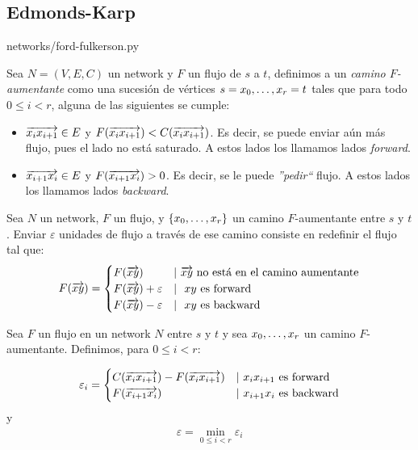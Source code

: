 \subsection{Edmonds-Karp}

\begin{lstinputlisting}[language=python]{networks/ford-fulkerson.py}
\end{lstinputlisting}

\begin{definition}
  Sea $N = (V,E,C)$ un network y $F$ un flujo de $s$ a $t$, definimos a un
  \emph{camino $F$-aumentante} como una sucesión de vértices
  $s = x_0, \mathellipsis, x_r = t$ tales que para todo $0 \le i < r$, alguna
  de las siguientes se cumple:
  \begin{itemize}
  \item $\overrightarrow{x_i x_{i+1}} \in E$ y
    $F(\overrightarrow{x_i x_{i+1}}) < C(\overrightarrow{x_i x_{i+1}})$. Es decir, se puede enviar aún
    más flujo, pues el lado no está saturado. A estos lados los llamamos lados
    \emph{forward}.
  \item $\overrightarrow{x_{i+1} x_i} \in E$ y $F(\overrightarrow{x_{i+1} x_i}) > 0$. Es decir, se le
    puede \emph{''pedir``} flujo. A estos lados los llamamos lados
    \emph{backward}.
  \end{itemize}
\end{definition}

\begin{definition}
  Sea $N$ un network, $F$ un flujo, y $\{x_0,\mathellipsis,x_r\}$ un camino
  $F$-aumentante entre $s$ y $t$. Enviar $\varepsilon$ unidades de flujo a
  través de ese camino consiste en redefinir el flujo tal que:
  \begin{align}
    F(\overrightarrow{xy}) =
    \begin{cases}
      F(\overrightarrow{xy}) & |\ \text{$\overrightarrow{xy}$ no está en el camino aumentante}\\
      F(\overrightarrow{xy}) + \varepsilon & |\ \text{ $xy$ es forward}\\
      F(\overrightarrow{xy}) - \varepsilon & |\ \text{ $xy$ es backward}
    \end{cases}
  \end{align}
\end{definition}

\begin{definition}
  Sea $F$ un flujo en un network $N$ entre $s$ y $t$ y sea
  $x_0, \mathellipsis, x_r$ un camino $F$-aumentante.
  Definimos, para $0 \le i < r:$
  
  \begin{align}
    \varepsilon_i = 
    \begin{cases}
      C(\overrightarrow{x_ix_{i+1}}) - F(\overrightarrow{x_ix_{i+1}}) & |\ x_ix_{i+1} \text{ es forward}\\
      F(\overrightarrow{x_{i+1} x_i}) & |\ x_{i+1}x_i \text{ es backward}
    \end{cases}
  \end{align}
  y
  \begin{align}
    \varepsilon = \min_{0 \le i < r} \varepsilon_i
  \end{align}
\end{definition}

